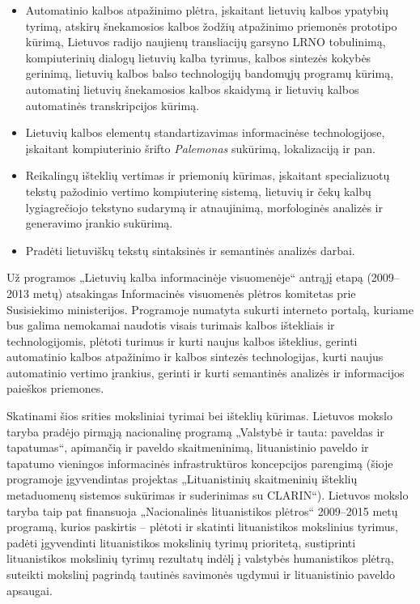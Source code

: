 \begin{multicols}{2}
\begin{itemize}
\item Automatinio kalbos atpažinimo plėtra, įskaitant lietuvių kalbos ypatybių tyrimą, atskirų šnekamosios kalbos žodžių atpažinimo priemonės prototipo kūrimą, Lietuvos radijo naujienų transliacijų garsyno LRNO tobulinimą, kompiuterinių dialogų lietuvių kalba tyrimus, kalbos sintezės kokybės gerinimą, lietuvių kalbos balso technologijų bandomųjų programų kūrimą, automatinį lietuvių šnekamosios kalbos skaidymą ir lietuvių kalbos automatinės transkripcijos kūrimą.
\item Lietuvių kalbos elementų standartizavimas informacinėse technologijose, įskaitant kompiuterinio šrifto \textit{Palemonas} sukūrimą, lokalizaciją ir pan.
\item Reikalingų išteklių vertimas ir priemonių kūrimas, įskaitant specializuotų tekstų pažodinio vertimo kompiuterinę sistemą, lietuvių ir čekų kalbų lygiagrečiojo tekstyno sudarymą ir atnaujinimą, morfologinės analizės ir generavimo įrankio sukūrimą.
\item Pradėti lietuviškų tekstų sintaksinės ir semantinės analizės darbai. 
\end{itemize}

    Už programos „Lietuvių kalba informacinėje visuomenėje“ antrąjį etapą (2009–2013 metų) atsakingas Informacinės visuomenės plėtros komitetas prie Susisiekimo ministerijos. Programoje numatyta sukurti interneto portalą, kuriame bus galima nemokamai naudotis visais turimais kalbos ištekliais ir technologijomis, plėtoti turimus ir kurti naujus kalbos išteklius, gerinti automatinio kalbos atpažinimo ir kalbos sintezės technologijas, kurti naujus automatinio vertimo įrankius, gerinti ir kurti semantinės analizės ir informacijos paieškos priemones.

Skatinami šios srities moksliniai tyrimai bei išteklių kūrimas. Lietuvos mokslo taryba pradėjo pirmąją nacionalinę programą „Valstybė ir tauta: paveldas ir tapatumas“, apimančią ir paveldo skaitmeninimą, lituanistinio paveldo ir tapatumo vieningos informacinės infrastruktūros koncepcijos parengimą (šioje programoje įgyvendintas projektas „Lituanistinių skaitmeninių išteklių metaduomenų sistemos sukūrimas ir suderinimas su CLARIN“). Lietuvos mokslo taryba taip pat finansuoja „Nacionalinės lituanistikos plėtros“ 2009–2015 metų programą, kurios paskirtis – plėtoti ir skatinti lituanistikos mokslinius tyrimus, padėti įgyvendinti lituanistikos mokslinių tyrimų prioritetą, sustiprinti lituanistikos mokslinių tyrimų rezultatų indėlį į valstybės humanistikos plėtrą, suteikti mokslinį pagrindą tautinės savimonės ugdymui ir lituanistinio paveldo apsaugai. 


\end{multicols}
